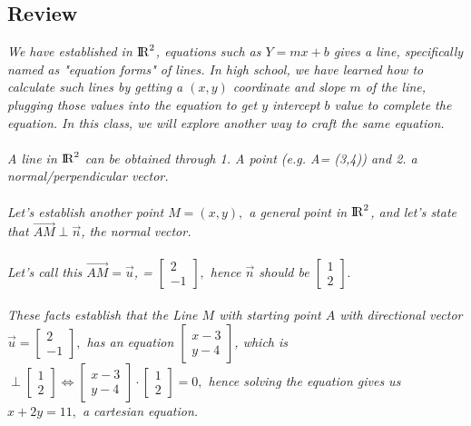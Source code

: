 \documentclass[addpoints]{exam}
\begin{document}
\subsection*{
Review
}
\textit{
We have established in ${\rm I\!R}^2$,  equations such as $Y=mx+b$ gives a line, specifically named as "equation forms" of lines. In high school, we have learned how to calculate such lines by getting a $(x,y)$ coordinate and slope $m$ of the line, plugging those values into the equation to get $y$ intercept $b$ value to complete the equation. In this class, we will explore another way to craft the same equation.\\\\
A line in ${\rm I\!R}^2$ can be obtained through 1. A point (e.g. A= (3,4)) and 2. a normal/perpendicular vector.\\\\
Let's establish another point $M=(x,y),$ a general point in ${\rm I\!R}^2$, and let's state that $\vec{AM}\perp\vec{n}$, the normal vector. \\\\
Let's call this $\vec{AM}=\vec{u}$, = $\begin{bmatrix}
    2\\-1
\end{bmatrix},$ hence $\vec{n}$ should be $\begin{bmatrix}
    1\\2
\end{bmatrix}.$ \\\\
These facts establish that the Line $M$ with starting point $A$ with directional vector $\vec{u}=\begin{bmatrix}
    2\\-1
    \end{bmatrix},$ has an equation $\begin{bmatrix}
        x-3\\y-4
    \end{bmatrix}$, which is $\perp \begin{bmatrix}
        1\\2
    \end{bmatrix} \Leftrightarrow \begin{bmatrix}
        x-3\\y-4
    \end{bmatrix}\cdot\begin{bmatrix}
        1\\2
    \end{bmatrix}=0,$ hence solving the equation gives us $x+2y=11,$ a cartesian equation. 
}\\\\
\end{document}
